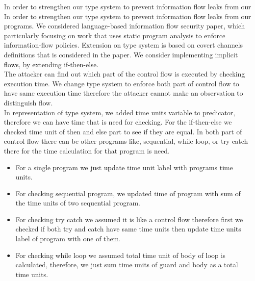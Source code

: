 \documentclass[../extensions.tex]{subfiles}
\begin{document}
In order to strengthen our type system to prevent information flow leaks from our 
In order to strengthen our type system to prevent information flow leaks from our programs. We considered language-based information flow security paper, which particularly focusing on work that uses static program analysis to enforce information-flow policies. Extension on type system is based on covert channels definitions that is considered in the paper. We consider implementing implicit flows, by extending if-then-else.
\newline
\\
The attacker can find out which part of the control flow is executed by checking execution time. We change type system to enforce both part of control flow to have same execution time therefore the attacker cannot make an observation to distinguish flow.
\newline
\\
In representation of type system, we added time units variable to predicator, therefore we can have time that is need for checking. For the if-then-else we checked time unit of then and else part to see if they are equal. In both part of control flow there can be other programs like, sequential, while loop, or try catch there for the time calculation for that program is need.  
\begin{itemize}
	\item For a single program we just update time unit label with programs time units.
	\item For checking sequential program, we updated time of program with sum of the time units of two sequential program.
	\item For checking try catch we assumed it is like a control flow therefore first we checked if both try and catch have same time units then update time units label of program with one of them.  
	\item For checking while loop we assumed total time unit of body of loop is calculated, therefore, we just sum time units of guard and body as a total time units.
\end{itemize}
\end{document}
